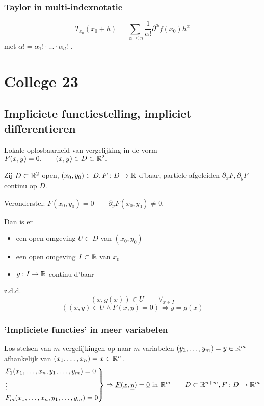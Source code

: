 \documentclass{2wa40summary}
\begin{document}
			\subsubsection{Taylor in multi-indexnotatie}
				\[ T_{x_0} (x_0 + h) = \sum_{|\alpha|\le n} \frac{1}{\alpha !} \partial^\alpha f(x_0)h^\alpha \] met $ \alpha ! = \alpha_1 ! \cdot ... \cdot \alpha_d !$ .
		
	\newpage
	\section{College 23}
		\subsection{Impliciete functiestelling, impliciet differentieren}
			Lokale oplosbaarheid van vergelijking in de vorm $ F(x,y)=0. \qquad (x,y) \in D \subset \mathbb{R}^2. $
			
			 Zij $D \subset \mathbb{R}^2$ open, $ (x_0 , y_0 ) \in D, F:D \rightarrow \mathbb{R} $ d'baar, partiele afgeleiden $ \partial_x F, \partial_y F $ continu op $ D $.
			
			Veronderstel: $ F(x_0, y_0) = 0 \qquad \partial_y F(x_0, y_0)\neq 0 $.
			
			Dan is er 
			\begin{itemize} 
				\item[] een open omgeving $ U \subset D $ van $ (x_0,y_0) $
				\item[] een open omgeving $ I \subset \mathbb{R} $ van $ x_0 $
				\item[] $ g: I \rightarrow \mathbb{R} $ continu d'baar 
			\end{itemize}
			z.d.d.
			\[ (x,g(x)) \in U \qquad \forall_{x \in I} \]
			\[ ((x,y) \in U \wedge F(x,y)=0) \Leftrightarrow y=g(x) \]
			
			
			\subsubsection{'Impliciete functies' in meer variabelen}
				Los stelsen van $m$ vergelijkingen op naar $m$ variabelen $(y_1, \dots ,y_m) = y \in \mathbb{R}^m$ afhankelijk van $ (x_1, \dots , x_n) = x \in \mathbb{R}^n $.
				\[
				\begin{rcases*}
				F_1(x_1,\dots,x_n,y_1,\dots,y_m)=0 \\
				\vdots \\
				F_m(x_1,\dots,x_n,y_1,\dots,y_m)=0
				\end{rcases*} \Rightarrow \underline{F}(\underline{x},\underline{y})=\underline{0} \text{ in } \reals^m \qquad D \subset \reals^{n+m}, F: D \rightarrow \reals^m
				\]
				
\end{document}
